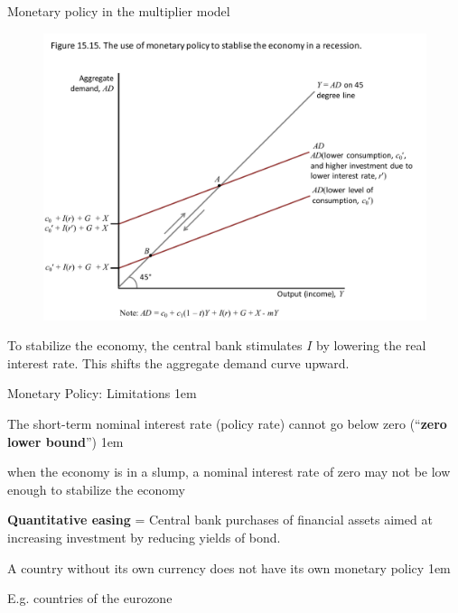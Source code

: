 \documentclass[11pt,aspectratio=43,usenames,dvipsnames]{beamer}
\let\olditemize=\itemize
\let\endolditemize=\enditemize
\renewenvironment{itemize}{\olditemize \itemsep1em}{\endolditemize}
\let\oldenumerate=\enumerate
\let\endoldenumerate=\endenumerate
\renewenvironment{enumerate}{\oldenumerate \itemsep1em}{ \endoldenumerate}
\theoremstyle{definition}
\begin{document}
\begin{frame}{Monetary policy in the multiplier model}
\label{slide:Monetary_policy_in_the_multiplier_model}
    \begin{figure}
        \centering
        \includegraphics[width=.7\textwidth]{./figures/18.pdf}
    \end{figure}

To stabilize the economy, the central bank stimulates $ I $ by \alert{lowering the real interest rate}. This shifts the aggregate demand curve upward.

\end{frame}

\begin{frame}{Monetary Policy: Limitations}
\label{slide:Monetary_Policy__Limitations}
    \begin{enumerate}
        \item  The short-term nominal interest rate (policy rate) cannot go below zero (``\textbf{zero lower bound}'')
        \begin{itemize}
            \item when the economy is in a slump, a nominal interest rate of zero may not be low enough to stabilize the economy
            \item \textbf{Quantitative easing} = Central bank \alert{purchases} of financial assets aimed at \alert{increasing investment by reducing yields of bond}.
        \end{itemize}
        \item A country without its own currency does not have its own monetary policy
        \begin{itemize}
            \item E.g. countries of the eurozone
        \end{itemize}

    \end{enumerate}


\end{frame}
\end{document}
